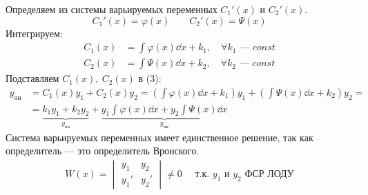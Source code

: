 Определяем из системы варьируемых переменных $C_1'(x)$ и $C_2'(x)$.
\[
    C_1'(x) = \varphi(x)\qquad C_2'(x) = \Psi (x)
\]
Интегрируем:
\begin{align*}
    C_1(x) &= \int \varphi(x)\dd{x} + k_1,\quad \forall k_1 \text{ --- } const \\
    C_2(x) &= \int \Psi(x)\dd{x} + k_2,\quad \forall k_2 \text{ --- } const
\end{align*}
Подставляем $C_1(x),\ C_2(x)$ в (3):
\begin{align*}
    y_{\text{он}} &= C_1(x) y_1 + C_2(x) y_2 = \left(\int \varphi(x)\dd{x} + k_1\right) y_1 + \left(\int \Psi (x)\dd{x} + k_2\right) y_2 = \\ 
    &= \underbrace{k_1y_1 + k_2y_2}_{y_{\text{оо}}} + \underbrace{y_1 \int \varphi(x) \dd{x} + y_2 \int \Psi(x)\dd{x}}_{y_{\text{чн}}}
\end{align*}
Система варьируемых переменных имеет единственное решение, так как определитель --- это определитель Вронского.
\begin{gather*}
    W(x) = \begin{vmatrix}
        y_1 & y_2 \\
        y_1' & y_2'
    \end{vmatrix} \ne 0 \quad\text{ т.к. } y_1 \text{ и } y_2 \text{ ФСР ЛОДУ}
\end{gather*}

